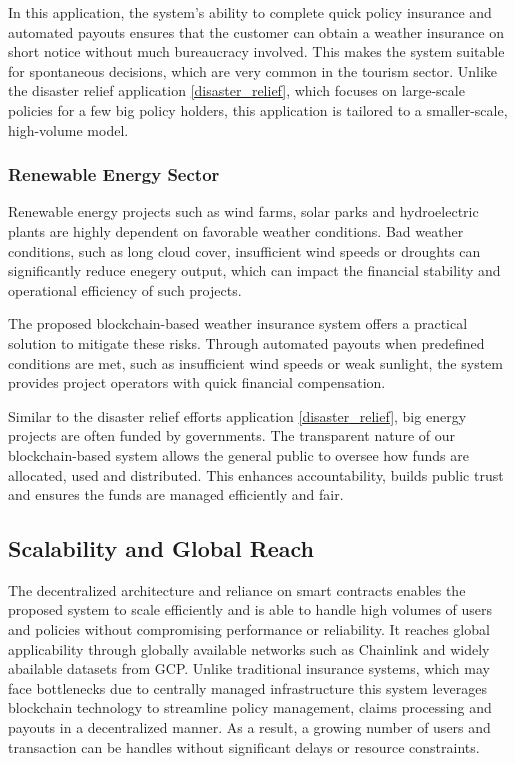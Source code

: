 In this application, the system's ability to complete quick policy insurance and automated payouts ensures that the customer can obtain a weather insurance on short notice without much bureaucracy involved. This makes the system suitable for spontaneous decisions, which are very common in the tourism sector. Unlike the disaster relief application \cref{disaster_relief}, which focuses on large-scale policies for a few big policy holders, this application is tailored to a smaller-scale, high-volume model. 

\subsubsection{Renewable Energy Sector}
Renewable energy projects such as wind farms, solar parks and hydroelectric plants are highly dependent on favorable weather conditions. Bad weather conditions, such as long cloud cover, insufficient wind speeds or droughts can significantly reduce enegery output, which can impact the financial stability and operational efficiency of such projects.

The proposed blockchain-based weather insurance system offers a practical solution to mitigate these risks. Through automated payouts when predefined conditions are met, such as insufficient wind speeds or weak sunlight, the system provides project operators with quick financial compensation.

Similar to the disaster relief efforts application \cref{disaster_relief}, big energy projects are often funded by governments. The transparent nature of our blockchain-based system allows the general public to oversee how funds are allocated, used and distributed. This enhances accountability, builds public trust and ensures the funds are managed efficiently and fair.

\subsection{Scalability and Global Reach}

The decentralized architecture and reliance on smart contracts enables the proposed system to scale efficiently and is able to handle high volumes of users and policies without compromising performance or reliability. It reaches global applicability through globally available networks such as Chainlink and widely abailable datasets from GCP. Unlike traditional insurance systems, which may face bottlenecks due to centrally managed infrastructure this system leverages blockchain technology to streamline policy management, claims processing and payouts in a decentralized manner. As a result, a growing number of users and transaction can be handles without significant delays or resource constraints.

